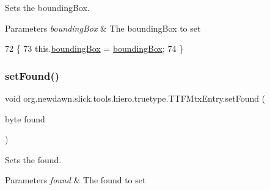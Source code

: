 Sets the bounding\+Box. 
\begin{DoxyParams}{Parameters}
{\em bounding\+Box} & The bounding\+Box to set \\
\hline
\end{DoxyParams}

\begin{DoxyCode}
72                                                   \{
73         this.\mbox{\hyperlink{classorg_1_1newdawn_1_1slick_1_1tools_1_1hiero_1_1truetype_1_1_t_t_f_mtx_entry_a7a0560528ae8fca8245ac8ee8de2714e}{boundingBox}} = \mbox{\hyperlink{classorg_1_1newdawn_1_1slick_1_1tools_1_1hiero_1_1truetype_1_1_t_t_f_mtx_entry_a7a0560528ae8fca8245ac8ee8de2714e}{boundingBox}};
74     \}
\end{DoxyCode}
\mbox{\label{classorg_1_1newdawn_1_1slick_1_1tools_1_1hiero_1_1truetype_1_1_t_t_f_mtx_entry_a8ac11186395f65ca8d849401007ebd2a}} 
\subsubsection{\texorpdfstring{set\+Found()}{setFound()}}
{\footnotesize\ttfamily void org.\+newdawn.\+slick.\+tools.\+hiero.\+truetype.\+T\+T\+F\+Mtx\+Entry.\+set\+Found (\begin{DoxyParamCaption}\item[{byte}]{found }\end{DoxyParamCaption})\hspace{0.3cm}{\ttfamily [inline]}}

Sets the found. 
\begin{DoxyParams}{Parameters}
{\em found} & The found to set \\
\hline
\end{DoxyParams}

